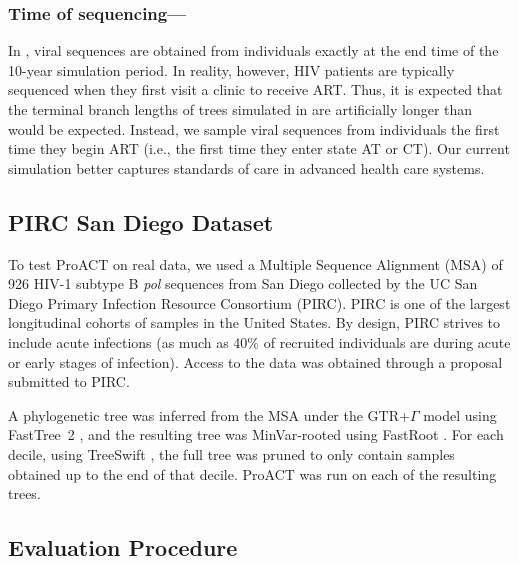 \documentclass[oupdraft]{sysbio}
\newcommand{\PLWH}{sample\xspace}
\begin{document}
\subsubsection{Time of sequencing---} In \citet{Moshiri2018},
viral sequences are obtained from individuals exactly at the end time of the 10-year simulation period.
In reality, however,
HIV patients are typically sequenced when they first visit a clinic to receive ART.
Thus, it is expected that the terminal branch lengths of trees simulated in \citet{Moshiri2018} are artificially longer than would be expected.
Instead,
we sample viral sequences from individuals the first time they begin ART (i.e., the first time they enter state AT or CT).
Our current simulation better captures standards of care in advanced health care systems. 


\subsection{PIRC San Diego Dataset}
To test ProACT on real data, we used a Multiple Sequence Alignment (MSA) of 926 HIV-1 subtype B \textit{pol} sequences from San Diego collected by the UC San Diego Primary Infection Resource Consortium (PIRC). 
PIRC  is one of the largest longitudinal cohorts of \PLWH{s} in the United States. By design, PIRC strives to include acute infections (as much as 40\% of recruited individuals are during acute or early stages of infection).  
Access to the data was obtained through a proposal submitted to PIRC.

A phylogenetic tree was inferred from the MSA under the GTR+$\Gamma$ model using FastTree~2 \citep{Price2010}, and the resulting tree was MinVar-rooted using FastRoot \citep{Mai2017}. For each decile, using TreeSwift \citep{Moshiri2018b}, the full tree was pruned to only contain samples obtained up to the end of that decile. ProACT was run on each of the resulting trees.

\subsection{Evaluation Procedure}
\end{document}

